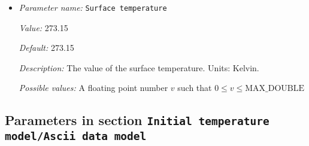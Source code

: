 \begin{itemize}
{\it Default:} 1673.15


{\it Description:} The value of the isothermal boundary temperature. Units: Kelvin.


{\it Possible values:} A floating point number $v$ such that $0 \leq v \leq \text{MAX\_DOUBLE}$
\item {\it Parameter name:} {\tt Surface temperature}
\label{parameters:Initial temperature model/Adiabatic boundary/Surface temperature}


{\it Value:} 273.15


{\it Default:} 273.15


{\it Description:} The value of the surface temperature. Units: Kelvin.


{\it Possible values:} A floating point number $v$ such that $0 \leq v \leq \text{MAX\_DOUBLE}$
\end{itemize}

\subsection{Parameters in section \tt Initial temperature model/Ascii data model}
\label{parameters:Initial_20temperature_20model/Ascii_20data_20model}

